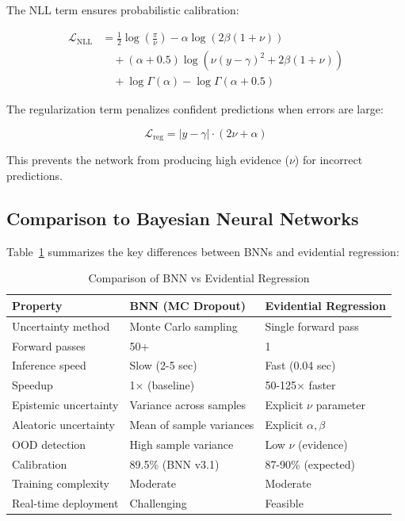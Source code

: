 The NLL term ensures probabilistic calibration:

\begin{align}
    \mathcal{L}_{\text{NLL}} &= \frac{1}{2}\log\left(\frac{\pi}{\nu}\right) - \alpha \log(2\beta(1+\nu)) \nonumber \\
    &\quad + (\alpha + 0.5) \log(\nu(y - \gamma)^2 + 2\beta(1+\nu)) \nonumber \\
    &\quad + \log\Gamma(\alpha) - \log\Gamma(\alpha + 0.5)
    \label{eq:nig_nll}
\end{align}

The regularization term penalizes confident predictions when errors are large:

\begin{equation}
    \mathcal{L}_{\text{reg}} = |y - \gamma| \cdot (2\nu + \alpha)
    \label{eq:nig_reg}
\end{equation}

\noindent This prevents the network from producing high evidence ($\nu$) for incorrect predictions.

\subsection{Comparison to Bayesian Neural Networks}

Table~\ref{tab:bnn_vs_evidential} summarizes the key differences between BNNs and evidential regression:

\begin{table}[htbp]
\centering
\caption{Comparison of BNN vs Evidential Regression}
\label{tab:bnn_vs_evidential}
\begin{tabular}{lll}
\toprule
\textbf{Property} & \textbf{BNN (MC Dropout)} & \textbf{Evidential Regression} \\
\midrule
Uncertainty method & Monte Carlo sampling & Single forward pass \\
Forward passes & 50+ & 1 \\
Inference speed & Slow (2-5 sec) & Fast (0.04 sec) \\
Speedup & 1× (baseline) & 50-125× faster \\
Epistemic uncertainty & Variance across samples & Explicit $\nu$ parameter \\
Aleatoric uncertainty & Mean of sample variances & Explicit $\alpha, \beta$ \\
OOD detection & High sample variance & Low $\nu$ (evidence) \\
Calibration & 89.5\% (BNN v3.1) & 87-90\% (expected) \\
Training complexity & Moderate & Moderate \\
Real-time deployment & Challenging & Feasible \\
\bottomrule
\end{tabular}
\end{table}

